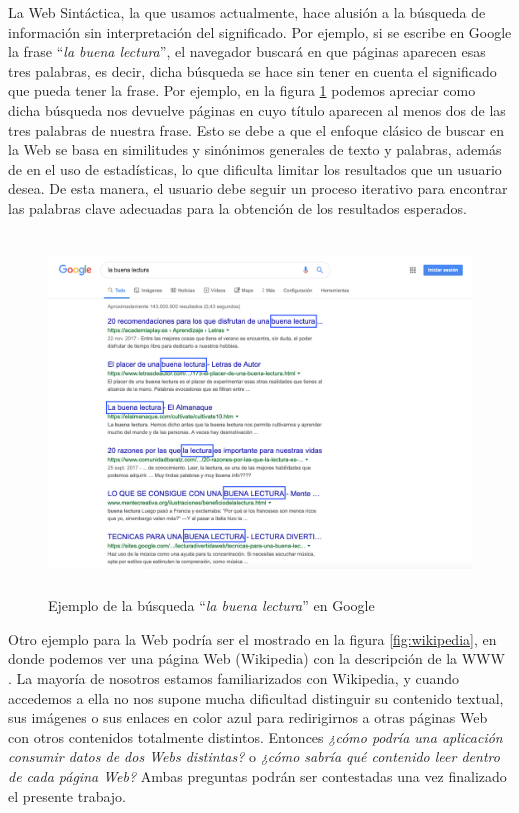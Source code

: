 La Web Sintáctica, la que usamos actualmente, hace alusión a la búsqueda de información sin interpretación del significado. Por ejemplo, si se escribe en Google la frase ``\textit{la buena lectura}'', el navegador buscará en que páginas aparecen esas tres palabras, es decir, dicha búsqueda se hace sin tener en cuenta el significado que pueda tener la frase. Por ejemplo, en la figura \ref{ejemplo} podemos apreciar como dicha búsqueda nos devuelve páginas en cuyo título aparecen al menos dos de las tres palabras de nuestra frase. Esto se debe a que el enfoque clásico de buscar en la Web se basa en similitudes y sinónimos generales de texto y palabras, además de en el uso de estadísticas, lo que dificulta limitar los resultados que un usuario desea. De esta manera, el usuario debe seguir un proceso iterativo para encontrar las palabras clave adecuadas para la obtención de los resultados esperados.

\begin{figure}[H]
	\centering
	\includegraphics[height=9.5cm]{imagenes/capitulo3/ejemplo}
	\caption{Ejemplo de la búsqueda ``\textit{la buena lectura}'' en Google}
	\label{ejemplo}
\end{figure}

Otro ejemplo para la Web podría ser el mostrado en la figura \ref{fig:wikipedia}, en donde podemos ver una página Web (Wikipedia) con la descripción de la WWW \cite{coursera}. La mayoría de nosotros estamos familiarizados con Wikipedia, y cuando accedemos a ella no nos supone mucha dificultad distinguir su contenido textual, sus imágenes o sus enlaces en color azul para redirigirnos a otras páginas Web con otros contenidos totalmente distintos. Entonces \textit{¿cómo podría una aplicación consumir datos de dos Webs distintas?} o \textit{¿cómo sabría qué contenido leer dentro de cada página Web?} Ambas preguntas podrán ser contestadas una vez finalizado el presente trabajo.

